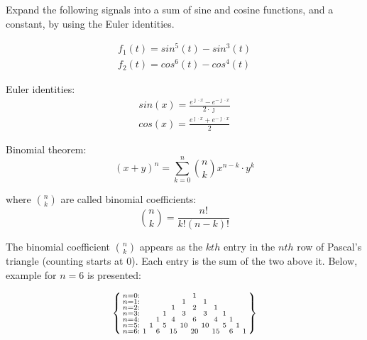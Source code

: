 \begin{task}
Expand the following signals into a sum of sine and cosine functions, and a constant, by using the Euler identities.

\begin{align*}
f_{1}(t)=sin^5(t)-sin^3(t) \\
f_{2}(t)=cos^6(t)-cos^4(t)
\end{align*}

Euler identities:
\begin{align*}
sin\left(x\right) = \frac{e^{\jmath \cdot x} - e^{-\jmath \cdot x}}{2 \cdot \jmath}\\
cos\left(x\right) = \frac{e^{\jmath \cdot x} + e^{-\jmath \cdot x}}{2}
\end{align*}

Binomial theorem:
\begin{equation}
(x+y)^{n} = \sum_{k=0}^{n} \binom{n}{k} x^{n-k} \cdot y^{k}
\end{equation}

where $\binom{n}{k}$ are called binomial coefficients:
\begin{equation}
\binom{n}{k} = \frac{n!}{k!(n-k)!}
\end{equation}

The binomial coefficient $\binom{n}{k}$ appears as the $kth$ entry in the $nth$ row of Pascal's triangle (counting starts at 0). Each entry is the sum of the two above it. Below, example for $n=6$ is presented:

\begin{equation}
\begin{Bsmallmatrix}
    n=0:&   &   &   &   &   &   & 1 &   &   &   &   &  & \\
    n=1:&   &   &   &   &   & 1 &   & 1 &   &   &   &  & \\
    n=2:&   &   &   &   & 1 &   & 2 &   & 1 &   &   &  & \\
    n=3:&   &   &   & 1 &   & 3 &   & 3 &   & 1 &   &  & \\
    n=4:&   &   & 1 &   & 4 &   & 6 &   & 4 &   & 1 &  & \\
    n=5:&   & 1 &   & 5 &   &10 &   & 10&   & 5 &   & 1& \\
    n=6:& 1 &   & 6 &   & 15&   & 20&   & 15&   & 6 &  & 1
\end{Bsmallmatrix}
\end{equation}


\end{task}
